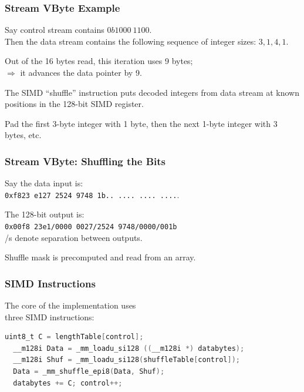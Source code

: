 \begin{frame}
\frametitle{Stream VByte Example}

\begin{changemargin}{2cm}
Say control stream contains $0b1000~1100$. \\
Then the data stream
contains the following sequence of integer sizes: $3, 1, 4, 1$. 

Out of the 16 bytes read,
this iteration uses 9 bytes; \\
\hspace*{2em} $\Rightarrow$ it advances the data pointer by 9. 

The SIMD
``shuffle'' instruction puts decoded integers from data stream at known positions in the
128-bit SIMD register.

Pad the first 3-byte integer with 1 byte, then
the next 1-byte integer with 3 bytes, etc. 
\end{changemargin}
\end{frame}

\begin{frame}
\frametitle{Stream VByte: Shuffling the Bits}
\vspace*{-1em}
\begin{changemargin}{1cm}
Say the data input is:\\
{\tt 0xf823~e127~2524~9748~1b..~....~....~....}. 

The 128-bit output is:\\
{\tt 0x00f8~23e1/0000~0027/2524 9748/0000/001b}\\
/s denote separation
between outputs. 

Shuffle mask is precomputed and
read from an array.
\end{changemargin}
\end{frame}

\begin{frame}[fragile]
\frametitle{SIMD Instructions}

\vspace*{-1em}
\begin{changemargin}{1cm}
The core of the implementation uses\\
three SIMD instructions:
\begin{lstlisting}[language=C]
  uint8_t C = lengthTable[control];
  __m128i Data = _mm_loadu_si128 ((__m128i *) databytes);
  __m128i Shuf = _mm_loadu_si128(shuffleTable[control]);
  Data = _mm_shuffle_epi8(Data, Shuf);
  databytes += C; control++;
\end{lstlisting}
\end{changemargin}
\end{frame}


